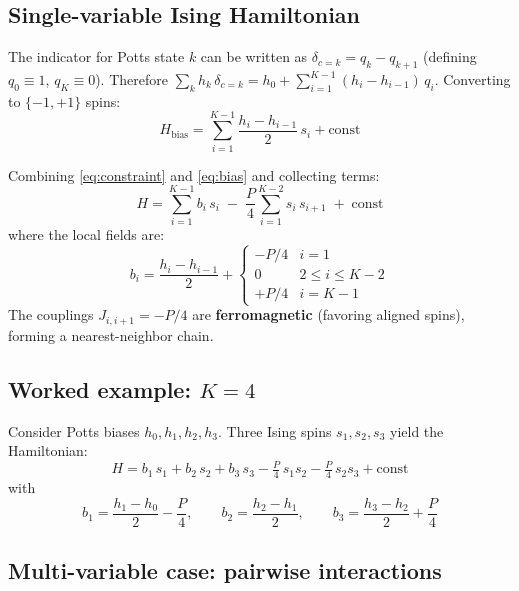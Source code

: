 \documentclass[11pt]{article}
\begin{document}
\subsection*{Single-variable Ising Hamiltonian}

The indicator for Potts state $k$ can be written as $\delta_{c=k} = q_k - q_{k+1}$ (defining $q_0 \equiv 1$, $q_K \equiv 0$).
Therefore $\sum_k h_k\,\delta_{c=k} = h_0 + \sum_{i=1}^{K-1}(h_i - h_{i-1})\,q_i$.
Converting to $\{-1,+1\}$ spins:
\begin{equation}\label{eq:bias}
  H_{\mathrm{bias}} = \sum_{i=1}^{K-1} \frac{h_i - h_{i-1}}{2}\, s_i + \mathrm{const}
\end{equation}

Combining \cref{eq:constraint} and \cref{eq:bias} and collecting terms:
\begin{equation}\label{eq:single-full}
\boxed{
  H = \sum_{i=1}^{K-1} b_i\, s_i \;-\; \frac{P}{4}\sum_{i=1}^{K-2} s_i\, s_{i+1} \;+\; \mathrm{const}
}
\end{equation}
where the local fields are:
\begin{equation}\label{eq:fields}
  b_i = \frac{h_i - h_{i-1}}{2} +
  \begin{cases}
    -P/4 & i = 1 \\
    0 & 2 \leq i \leq K{-}2 \\
    +P/4 & i = K{-}1
  \end{cases}
\end{equation}
The couplings $J_{i,i+1} = -P/4$ are \textbf{ferromagnetic} (favoring aligned spins), forming a nearest-neighbor chain.

\subsection*{Worked example: $K=4$}

Consider Potts biases $h_0, h_1, h_2, h_3$.
Three Ising spins $s_1, s_2, s_3$ yield the Hamiltonian:
\begin{equation}
  H = b_1\, s_1 + b_2\, s_2 + b_3\, s_3 - \tfrac{P}{4}\, s_1 s_2 - \tfrac{P}{4}\, s_2 s_3 + \mathrm{const}
\end{equation}
with
\begin{equation}
  b_1 = \frac{h_1 - h_0}{2} - \frac{P}{4}, \qquad
  b_2 = \frac{h_2 - h_1}{2}, \qquad
  b_3 = \frac{h_3 - h_2}{2} + \frac{P}{4}
\end{equation}

\subsection*{Multi-variable case: pairwise interactions}
\end{document}
